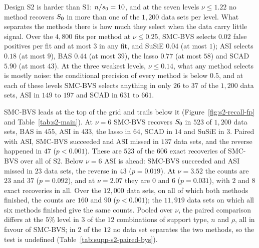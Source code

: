 \begin{table}[t]\centering\small\setlength{\tabcolsep}{4.5pt}
\caption{Design S2 at the three strongest signals, by support type, pooled over $n$ and $\rho$ ($600$ fits per cell):
number of data sets with $\Shat=\Sz$, mean $\abs{\Shat}$, number of empty selections, conditional precision (the mean
over the non-empty selections, $220$ to $595$ per cell) and mean recall. Empty selections include
the failed BAS fits. The largest Monte Carlo standard errors are $12.2$ data sets for exact recovery, $0.47$ for
$\abs{\Shat}$, $0.020$ for conditional precision and $0.01$ for recall.}\label{tab:s2-main}

\end{table}

Design S2 is harder than S1: $n/s_0=10$, and at the seven levels $\nu\le1.22$ no method recovers $S_0$ in more than one
of the $1{,}200$ data sets per level. What separates the methods there is how much they select when the data carry
little signal. Over the $4{,}800$ fits per method at $\nu\le0.25$, SMC-BVS selects $0.02$ false positives per fit and
at most $3$ in any fit, and SuSiE $0.04$ (at most $1$); ASI selects $0.18$ (at most $9$), BAS $0.44$ (at most $39$),
the lasso $0.77$ (at most $58$) and SCAD $5.90$ (at most $43$). At the three weakest levels, $\nu\le0.14$, what any method selects
is mostly noise: the conditional precision of every method is below $0.5$, and at each of these levels SMC-BVS selects
anything in only $26$ to $37$ of the $1{,}200$ data sets, ASI in $149$ to $197$ and SCAD in $631$ to $661$.

SMC-BVS leads at the top of the grid and trails below it (Figure~\ref{fig:s2-recall-fp} and
Table~\ref{tab:s2-main}). At $\nu=6$ SMC-BVS recovers $S_0$ in $523$ of $1{,}200$ data sets, BAS in $455$, ASI in
$433$, the lasso in $64$, SCAD in $14$ and SuSiE in $3$. Paired with ASI, SMC-BVS succeeded and ASI missed in $137$
data sets, and the reverse happened in $47$ ($p<0.001$). These are $523$ of the $606$ exact recoveries of SMC-BVS
over all of S2. Below $\nu=6$ ASI is ahead: SMC-BVS succeeded and ASI missed in $23$ data sets, the reverse in $43$
($p=0.019$). At $\nu=3.52$ the counts are $23$ and $37$ ($p=0.092$), and at $\nu=2.07$ they are $0$ and $6$
($p=0.031$), with $2$ and $8$ exact recoveries in all. Over the $12{,}000$ data sets, on all of which both methods
finished, the counts are $160$ and $90$ ($p<0.001$); the $11{,}919$ data sets on which all six methods finished give
the same counts. Pooled over $\nu$, the paired comparison differs at the $5\%$ level in $3$ of the $12$ combinations
of support type, $n$ and $\rho$, all in favour of SMC-BVS; in $2$ of the $12$ no data set separates the two methods,
so the test is undefined (Table~\ref{tab:supp-s2-paired-bys}).

